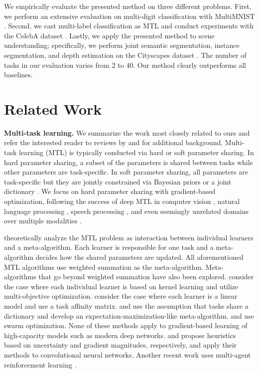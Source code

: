 \documentclass{article}
\begin{document}
We empirically evaluate the presented method on three different problems. First, we perform an extensive evaluation on multi-digit classification with MultiMNIST \citep{multi_mnist}. Second, we cast multi-label classification as MTL and conduct experiments with the CelebA dataset \citep{celeba}. Lastly, we apply the presented method to scene understanding; specifically, we perform joint semantic segmentation, instance segmentation, and depth estimation on the Cityscapes dataset \citep{cityscapes}. The number of tasks in our evaluation varies from 2 to 40. Our method clearly outperforms all baselines.
 

\section{Related Work}
\label{sec:related}


\noindent \textbf{Multi-task learning.}
We summarize the work most closely related to ours and refer the interested reader to reviews by \citet{Ruder2017} and \citet{zhou2011malsar} for additional background.
Multi-task learning (MTL) is typically conducted via hard or soft parameter sharing. In hard parameter sharing, a subset of the parameters is shared between tasks while other parameters are task-specific. In soft parameter sharing, all parameters are task-specific but they are jointly constrained via Bayesian priors \citep{Xue2007, Bakker2003} or a joint dictionary \citep{Argyriou2007, Long2015, Yang2017, Ruder2017}.  We focus on hard parameter sharing with gradient-based optimization, following the success of deep MTL in computer vision \citep{Bilen2016, Misra2016, Rudd2016, Yang2017, Kokkinos2016, Zamir2018}, natural language processing \citep{Collobert2008, Dong2015, Liu2015, Luong2015, Hashimoto2016}, speech processing \citep{Huang2013,Seltzer2013,Huang2015}, and even seemingly unrelated domains over multiple modalities \citep{Kaiser2017}.

\citet{Baxter2000} theoretically analyze the MTL problem as interaction between individual learners and a meta-algorithm. Each learner is responsible for one task and a meta-algorithm decides how the shared parameters are updated. All aforementioned MTL algorithms use weighted summation as the meta-algorithm. Meta-algorithms that go beyond weighted summation have also been explored. \citet{Cong2014} consider the case where each individual learner is based on kernel learning and utilize multi-objective optimization. \citet{Zhang2010} consider the case where each learner is a linear model and use a task affinity matrix. \citet{Zhou2011} and \citet{Bagherjeiran2005} use the assumption that tasks share a dictionary and develop an expectation-maximization-like meta-algorithm. \citet{Miranda2012} and \citet{ZhouDi2017} use swarm optimization. None of these methods apply to gradient-based learning of high-capacity models such as modern deep networks. \citet{Kendall2018} and \citet{Chen2018} propose heuristics based on uncertainty and gradient magnitudes, respectively, and apply their methods to convolutional neural networks. Another recent work uses multi-agent reinforcement learning \citep{Rosenbaum2017}.
\end{document}
